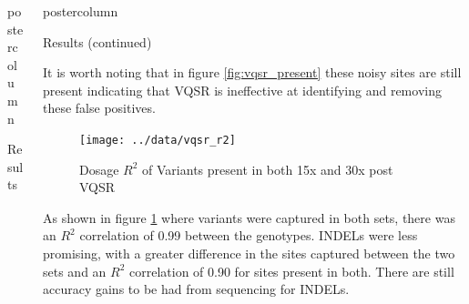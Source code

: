 \documentclass[final,xcolor=table]{beamer}
\begin{document}
\begin{frame}{}
\begin{columns}
\begin{column}{.49\textwidth}
\begin{beamercolorbox}[center,wd=\textwidth]{postercolumn}
\begin{minipage}[T]{.95\textwidth}
\begin{block}{Results}
            \end{block}
            \vfill

            \end{minipage}
        \end{beamercolorbox}
    \end{column}
        \begin{column}{.49\textwidth}
        \begin{beamercolorbox}[center,wd=\textwidth]{postercolumn}
            \begin{minipage}[T]{.95\textwidth}  %

            \begin{block}{Results (continued)}

                It is worth noting that in figure \ref{fig:vqsr_present} these noisy sites are still present indicating that VQSR is ineffective at identifying and removing these false positives.

                \begin{figure}
                \texttt{[image: ../data/vqsr\_r2]}
                \caption{Dosage $R^2$ of Variants present in both 15x and 30x post VQSR}
                \label{fig:r2}
                \end{figure}

                As shown in figure \ref{fig:r2} where variants were captured in both sets, there was an $R^2$ correlation of 0.99 between the genotypes. INDELs were less promising, with a greater difference in the sites captured between the two sets and an $R^2$ correlation of 0.90 for sites present in both. There are still accuracy gains to be had from sequencing for INDELs.


\end{block}
\end{minipage}
\end{beamercolorbox}
\end{column}
\end{columns}
\end{frame}
\end{document}
